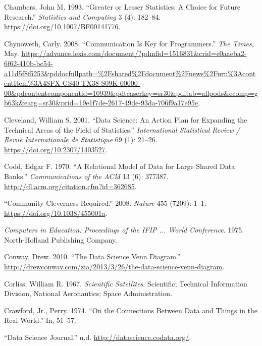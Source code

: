 \documentclass[
  letterpaper,
]{report}
\newlength{\cslhangindent}
\newlength{\cslentryspacingunit} %
\newenvironment{CSLReferences}[2] %
 {%
  \setlength{\parindent}{0pt}
  \ifodd #1
  \let\oldpar\par
  \def\par{\hangindent=\cslhangindent\oldpar}
  \fi
  \setlength{\parskip}{#2\cslentryspacingunit}
 }%
 {}
\begin{document}
\begin{CSLReferences}{1}{0}
\leavevmode{}%
Chambers, John M. 1993. {``Greater or {Lesser Statistics}: {A Choice}
for {Future Research}.''} \emph{Statistics and Computing} 3 (4):
182--84. \url{https://doi.org/10.1007/BF00141776}.

\leavevmode{}%
Chynoweth, Carly. 2008. {``Communication Is Key for Programmers.''}
\emph{The Times}, May.
\url{https://advance.lexis.com/document/?pdmfid=1516831\&crid=e0aaeba2-6f62-410b-bc54-a11d5f8f5253\&pddocfullpath=\%2Fshared\%2Fdocument\%2Fnews\%2Furn\%3AcontentItem\%3A4SFX-GS40-TX38-S09K-00000-00\&pdcontentcomponentid=10939\&pdteaserkey=sr30\&pditab=allpods\&ecomp=gb63k\&earg=sr30\&prid=19e1f7de-2617-49de-93da-706f9a17e95e}.

\leavevmode{}%
Cleveland, William S. 2001. {``Data Science: An Action Plan for
Expanding the Technical Areas of the Field of Statistics.''}
\emph{International Statistical Review / Revue Internationale de
Statistique} 69 (1): 21--26. \url{https://doi.org/10.2307/1403527}.

\leavevmode{}%
Codd, Edgar F. 1970. {``A Relational Model of Data for Large Shared Data
Banks.''} \emph{Communications of the ACM} 13 (6): 377387.
\url{http://dl.acm.org/citation.cfm?id=362685}.

\leavevmode{}%
{``Community Cleverness Required.''} 2008. \emph{Nature} 455 (7209):
1--1. \url{https://doi.org/10.1038/455001a}.

\leavevmode{}%
\emph{Computers in Education: Proceedings of the IFIP ... World
Conference}. 1975. North-Holland Publishing Company.

\leavevmode{}%
Conway, Drew. 2010. {``The Data Science Venn Diagram.''}
\url{http://drewconway.com/zia/2013/3/26/the-data-science-venn-diagram}.

\leavevmode{}%
Corliss, William R. 1967. \emph{Scientific Satellites}. Scientific;
Technical Information Division, National Aeronautics; Space
Administration.

\leavevmode{}%
Crawford, Jr., Perry. 1974. {``On the Connections Between Data and
Things in the Real World.''} In, 51--57.

\leavevmode{}%
{``Data Science Journal.''} n.d. \url{http://datascience.codata.org/}.


\end{CSLReferences}
\end{document}
